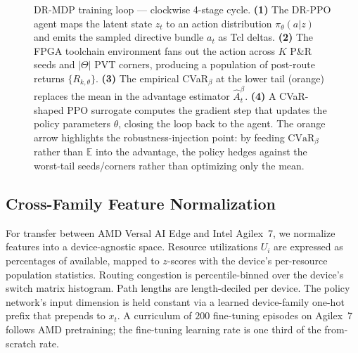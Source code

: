 \documentclass[journal,onecolumn=false]{IEEEtran}
\begin{document}
\begin{figure}[t]
\caption{DR-MDP training loop — clockwise 4-stage cycle. \textbf{(1)} The DR-PPO agent maps the latent state $z_t$ to an action distribution $\pi_\theta(a|z)$ and emits the sampled directive bundle $a_t$ as Tcl deltas. \textbf{(2)} The FPGA toolchain environment fans out the action across $K$ P\&R seeds and $|\Theta|$ PVT corners, producing a population of post-route returns $\{R_{k,\theta}\}$. \textbf{(3)} The empirical CVaR$_\beta$ at the lower tail (orange) replaces the mean in the advantage estimator $\hat A^\beta_t$. \textbf{(4)} A CVaR-shaped PPO surrogate computes the gradient step that updates the policy parameters $\theta$, closing the loop back to the agent. The orange arrow highlights the robustness-injection point: by feeding $\mathrm{CVaR}_\beta$ rather than $\mathbb{E}$ into the advantage, the policy hedges against the worst-tail seeds/corners rather than optimizing only the mean.}
\label{fig:rlloop}
\end{figure}

\subsection{Cross-Family Feature Normalization}
For transfer between AMD Versal AI Edge and Intel Agilex~7, we normalize features into a device-agnostic space. Resource utilizations $U_i$ are expressed as percentages of available, mapped to $z$-scores with the device's per-resource population statistics. Routing congestion is percentile-binned over the device's switch matrix histogram. Path lengths are length-deciled per device. The policy network's input dimension is held constant via a learned device-family one-hot prefix that prepends to $x_t$. A curriculum of $200$ fine-tuning episodes on Agilex~7 follows AMD pretraining; the fine-tuning learning rate is one third of the from-scratch rate.
\end{document}
